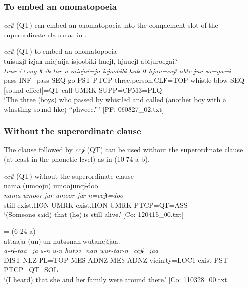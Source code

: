 \begin{xlist}
\subsubsection{To embed an onomatopoeia}\label{sec:10.4.1.6}

\textit{ccjɨ} (QT) can embed an onomatopoeia into the complement slot of the superordinate clause as in .

\ea\label{ex:10.73}   \textit{ccjɨ} (QT) to embed an onomatopoeia\\
      \glll    tuisuzjɨ  izjan  micjaija  isjoobiki  hucjɨ,  hjuucjɨ  abɨjuroogai?\\
    \textit{tuur-i+sug-tɨ}  \textit{ik-tar-n}  \textit{micjai=ja}  \textit{isjoobiki}  \textit{huk-tɨ}  \textit{hjuu=ccjɨ}  \textit{abɨr-jur-oo=ga=i}\\
    pass-INF+pass-SEQ  go-PST-PTCP  three.person.CLF=TOP  whistle  blow-SEQ  [sound effect]=QT  call-UMRK-SUPP=CFM3=PLQ\\
    \glt     ‘The three (boys) who passed by whistled and called (another boy with a whistling sound like) “phweee.”’ [PF: 090827\_02.txt]
    \z

\subsubsection{Without the superordinate clause}\label{sec:10.4.1.7}

The clause followed by \textit{ccjɨ} (QT) can be used without the superordinate clause (at least in the phonetic level) as in (10-74 a-b).

\ea\label{ex:10.74}   \textit{ccjɨ} (QT) without the superordinate clause\\
  \ea  %
      \glll    nama  (umooju)  umoojuncjɨdoo.\\
      \textit{nama}  \textit{umoor-jur}  \textit{umoor-jur-n=ccjɨ=doo}\\
      still  exist.HON-UMRK  exist.HON-UMRK-PTCP=QT=ASS\\
      \glt       ‘(Someone said) that (he) is still alive.’ [Co: 120415\_00.txt]

  \ex{} = (6-24 a)\\
      \glll    attaaja  (un)  un  hutəənan   wutancjɨjaa.\\
      \textit{a-rɨ-taa=ja}  \textit{u-n}  \textit{u-n}  \textit{hutəə=nan} \textit{wur-tar-n=ccjɨ=jaa}\\
      DIST-NLZ-PL=TOP  MES-ADNZ  MES-ADNZ  vicinity=LOC1 exist-PST-PTCP=QT=SOL\\
      \glt       ‘(I heard) that she and her family were around there.’ [Co: 110328\_00.txt]
    \z
\z


\end{xlist}
